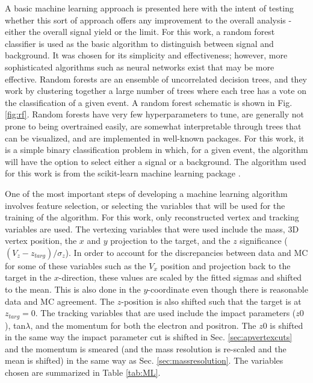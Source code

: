 A basic machine learning approach is presented here with the intent of testing whether this sort of approach offers any improvement to the overall analysis - either the overall signal yield or the limit. For this work, a random forest classifier is used as the basic algorithm to distinguish between signal and background. It was chosen for its simplicity and effectiveness; however, more sophisticated algorithms such as neural networks exist that may be more effective. Random forests are an ensemble of uncorrelated decision trees, and they work by clustering together a large number of trees where each tree has a vote on the classification of a given event. A random forest schematic is shown in Fig. \ref{fig:rf}. Random forests have very few hyperparameters to tune, are generally not prone to being overtrained easily, are somewhat interpretable through trees that can be visualized, and are implemented in well-known packages. For this work, it is a simple binary classification problem in which, for a given event, the algorithm will have the option to select either a signal or a background. The algorithm used for this work is from the scikit-learn machine learning package \cite{scikit}.

One of the most important steps of developing a machine learning algorithm involves feature selection, or selecting the variables that will be used for the training of the algorithm. For this work, only reconstructed vertex and tracking variables are used. The vertexing variables that were used include the mass, 3D vertex position, the $x$ and $y$ projection to the target, and the $z$ significance ($(V_z-z_{targ})/\sigma_z$). In order to account for the discrepancies between data and MC for some of these variables such as the $V_x$ position and projection back to the target in the $x$-direction, these values are scaled by the fitted sigmas and shifted to the mean. This is also done in the $y$-coordinate even though there is reasonable data and MC agreement. The $z$-position is also shifted such that the target is at $z_{targ}=0$. The tracking variables that are used include the impact parameters ($z0$), tan$\lambda$, and the momentum for both the electron and positron. The $z0$ is shifted in the same way the impact parameter cut is shifted in Sec. \ref{sec:apvertexcuts} and the momentum is smeared (and the mass resolution is re-scaled and the mean is shifted) in the same way as Sec. \ref{sec:massresolution}. The variables chosen are summarized in Table \ref{tab:ML}.

